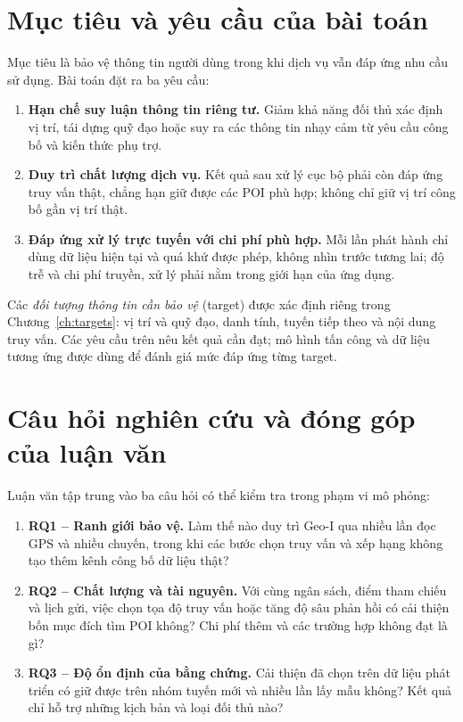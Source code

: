 \documentclass[12pt,a4paper,oneside]{report}
\begin{document}
\section{Mục tiêu và yêu cầu của bài toán}

Mục tiêu là bảo vệ thông tin người dùng trong khi dịch vụ vẫn đáp ứng nhu cầu sử dụng. Bài toán đặt ra ba yêu cầu:

\begin{enumerate}
  \item \textbf{Hạn chế suy luận thông tin riêng tư.} Giảm khả năng đối thủ xác định vị trí, tái dựng quỹ đạo hoặc suy ra các thông tin nhạy cảm từ yêu cầu công bố và kiến thức phụ trợ.
  \item \textbf{Duy trì chất lượng dịch vụ.} Kết quả sau xử lý cục bộ phải còn đáp ứng truy vấn thật, chẳng hạn giữ được các POI phù hợp; không chỉ giữ vị trí công bố gần vị trí thật.
  \item \textbf{Đáp ứng xử lý trực tuyến với chi phí phù hợp.} Mỗi lần phát hành chỉ dùng dữ liệu hiện tại và quá khứ được phép, không nhìn trước tương lai; độ trễ và chi phí truyền, xử lý phải nằm trong giới hạn của ứng dụng.
\end{enumerate}

Các \emph{đối tượng thông tin cần bảo vệ} (target) được xác định riêng trong Chương~\ref{ch:targets}: vị trí và quỹ đạo, danh tính, tuyến tiếp theo và nội dung truy vấn. Các yêu cầu trên nêu kết quả cần đạt; mô hình tấn công và dữ liệu tương ứng được dùng để đánh giá mức đáp ứng từng target.

\section{Câu hỏi nghiên cứu và đóng góp của luận văn}

Luận văn tập trung vào ba câu hỏi có thể kiểm tra trong phạm vi mô phỏng:
\begin{enumerate}
  \item \textbf{RQ1 -- Ranh giới bảo vệ.} Làm thế nào duy trì Geo-I qua nhiều lần đọc GPS và nhiều chuyến, trong khi các bước chọn truy vấn và xếp hạng không tạo thêm kênh công bố dữ liệu thật?
  \item \textbf{RQ2 -- Chất lượng và tài nguyên.} Với cùng ngân sách, điểm tham chiếu và lịch gửi, việc chọn tọa độ truy vấn hoặc tăng độ sâu phản hồi có cải thiện bốn mục đích tìm POI không? Chi phí thêm và các trường hợp không đạt là gì?
  \item \textbf{RQ3 -- Độ ổn định của bằng chứng.} Cải thiện đã chọn trên dữ liệu phát triển có giữ được trên nhóm tuyến mới và nhiều lần lấy mẫu không? Kết quả chỉ hỗ trợ những kịch bản và loại đối thủ nào?
\end{enumerate}
\end{document}
